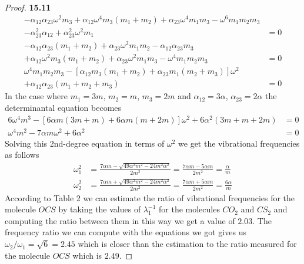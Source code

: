 \documentclass[11pt]{article}
\theoremstyle{definition}
\begin{document}
\begin{proof}{\textbf{15.11}}
\begin{align*}
        -\alpha_{12}\alpha_{23}\omega^2 m_3
        + \alpha_{12}\omega^4m_3(m_1 + m_2)
        + \alpha_{23}\omega^4m_1m_3 - \omega^6m_1m_2m_3\\
        - \alpha_{23}^2\alpha_{12} + \alpha_{23}^2\omega^2m_1 &= 0\\
        - \alpha_{12}\alpha_{23}(m_1 + m_2)
         + \alpha_{23}\omega^2m_1m_2
        -\alpha_{12}\alpha_{23} m_3\\
        + \alpha_{12}\omega^2m_3(m_1 + m_2)
        + \alpha_{23}\omega^2m_1m_3 - \omega^4m_1m_2m_3 
        &= 0\\
        \omega^4m_1m_2m_3
        - [\alpha_{12}m_3(m_1 + m_2) + \alpha_{23}m_1(m_2 + m_3)]\omega^2\\
        + \alpha_{12}\alpha_{23}(m_1 + m_2 + m_3)
        &= 0
    \end{align*}
    In the case where $m_1 = 3m$, $m_2 = m$, $m_3 = 2m$ and
    $\alpha_{12} = 3\alpha$, $\alpha_{23} = 2 \alpha$ the determinantal
    equation becomes
    \begin{align*}
        6\omega^4m^3 - [6\alpha m(3m + m) + 6\alpha m(m + 2m)]\omega^2
        + 6\alpha^2(3m + m + 2m) &= 0\\
        \omega^4m^2 - 7\alpha m\omega^2 + 6\alpha^2 &= 0
    \end{align*}
    Solving this 2nd-degree equation in terms of $\omega^2$
    we get the vibrational frequencies as follows
    \begin{align*}
        \omega_1^2 &=
            \frac{7\alpha m - \sqrt{49\alpha^2 m^2 - 24m^2\alpha^2}}{2m^2}
            = \frac{7\alpha m - 5\alpha m}{2m^2}
            = \frac{\alpha}{m}\\
        \omega_2^2 &=
        \frac{7\alpha m + \sqrt{49\alpha^2 m^2 - 24m^2\alpha^2}}{2m^2}
            = \frac{7\alpha m + 5\alpha m}{2m^2}
            = \frac{6\alpha}{m}
    \end{align*}
    According to Table 2 we can estimate the ratio of vibrational frequencies
    for the molecule $OCS$ by taking the values of $\lambda_1^{-1}$
    for the molecules $CO_2$ and $CS_2$ and computing the ratio between them
    in this way we get a value of $2.03$.
    The frequency ratio we can compute with the equations we got gives us
    $\omega_2/\omega_1 = \sqrt{6} = 2.45$ which is closer than the estimation
    to the ratio measured for the molecule $OCS$ which is $2.49$.
\end{proof}
\cleardoublepage
\end{document}
